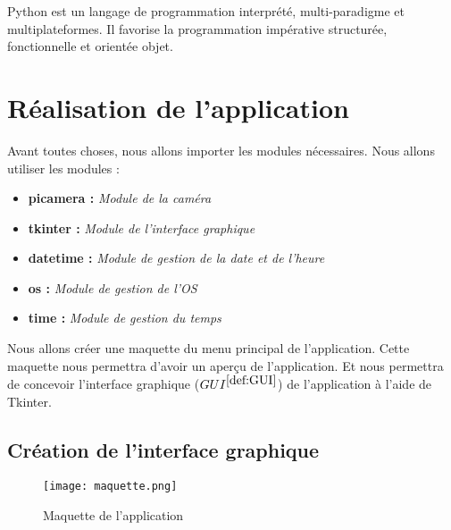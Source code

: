         \vspace{0.2cm}
        
        Python est un langage de programmation interprété, multi-paradigme et multiplateformes. Il favorise la programmation impérative structurée, fonctionnelle et orientée objet.
        


    
    \section{Réalisation de l'application}
        Avant toutes choses, nous allons importer les modules nécessaires.
        Nous allons utiliser les modules :
        \begin{itemize}
            \item \textbf{picamera :} \textit{Module de la caméra}
            \item \textbf{tkinter :} \textit{Module de l'interface graphique}
            \item \textbf{datetime :} \textit{Module de gestion de la date et de l'heure}
            \item \textbf{os :} \textit{Module de gestion de l'OS}
            \item \textbf{time :} \textit{Module de gestion du temps}
        \end{itemize}

        \vspace{0.2cm}
        
        Nous allons créer une maquette du menu principal de l'application.
        Cette maquette nous permettra d'avoir un aperçu de l'application.
        Et nous permettra de concevoir l'interface graphique (\underline{$GUI^{\ref{def:GUI}}$}) de l'application à l'aide de Tkinter.            

        \subsection{Création de l'interface graphique}
            \begin{figure}[ht]
                \centering
                \texttt{[image: maquette.png]} 
                \caption{Maquette de l'application}
            \end{figure}

